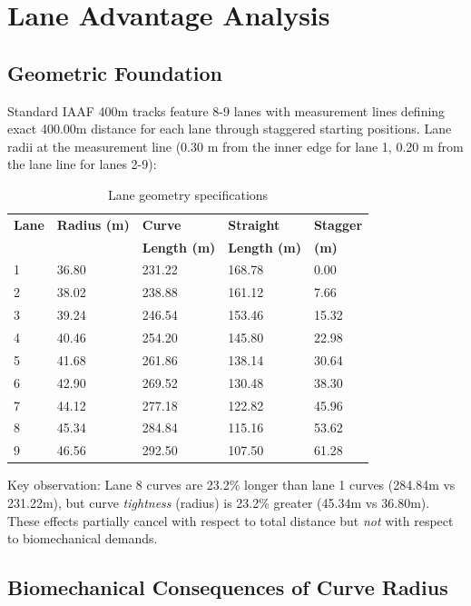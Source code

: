 \section{Lane Advantage Analysis}

\subsection{Geometric Foundation}

Standard IAAF 400m tracks feature 8-9 lanes with measurement lines defining exact 400.00m distance for each lane through staggered starting positions. Lane radii at the measurement line (0.30 m from the inner edge for lane 1, 0.20 m from the lane line for lanes 2-9):

\begin{table}[H]
\centering
\caption{Lane geometry specifications}
\begin{tabular}{@{}lllll@{}}
\toprule
\textbf{Lane} & \textbf{Radius (m)} & \textbf{Curve} & \textbf{Straight} & \textbf{Stagger} \\
 & & \textbf{Length (m)} & \textbf{Length (m)} & \textbf{(m)} \\
\midrule
1 & 36.80 & 231.22 & 168.78 & 0.00 \\
2 & 38.02 & 238.88 & 161.12 & 7.66 \\
3 & 39.24 & 246.54 & 153.46 & 15.32 \\
4 & 40.46 & 254.20 & 145.80 & 22.98 \\
5 & 41.68 & 261.86 & 138.14 & 30.64 \\
6 & 42.90 & 269.52 & 130.48 & 38.30 \\
7 & 44.12 & 277.18 & 122.82 & 45.96 \\
8 & 45.34 & 284.84 & 115.16 & 53.62 \\
9 & 46.56 & 292.50 & 107.50 & 61.28 \\
\bottomrule
\end{tabular}
\end{table}

Key observation: Lane 8 curves are 23.2\% longer than lane 1 curves (284.84m vs 231.22m), but curve \textit{tightness} (radius) is 23.2\% greater (45.34m vs 36.80m). These effects partially cancel with respect to total distance but \textit{not} with respect to biomechanical demands.

\subsection{Biomechanical Consequences of Curve Radius}

